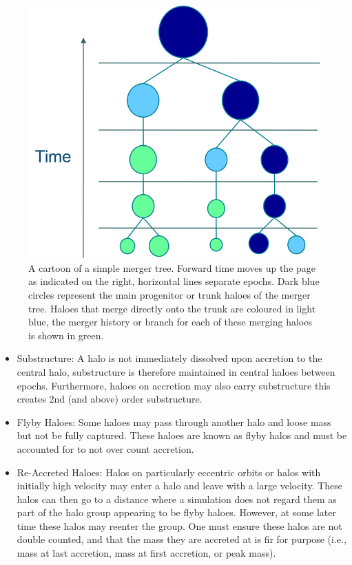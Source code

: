 \begin{figure}[h]
	\centering
	\includegraphics[width = \linewidth]{Figures/Chapter1/Merger_Tree_Simple.png}
    \caption{A cartoon of a simple merger tree. Forward time moves up the page as indicated on the right, horizontal lines separate epochs. Dark blue circles represent the main progenitor or trunk haloes of the merger tree. Haloes that merge directly onto the trunk are coloured in light blue, the merger history or branch for each of these merging haloes is shown in green.}
	\label{fig:SimpleTree}
\end{figure}

\begin{itemize}
    \item Substructure: A halo is not immediately dissolved upon accretion to the central halo, substructure is therefore maintained in central haloes between epochs. Furthermore, haloes on accretion may also carry substructure this creates 2nd (and above) order substructure.
    \item Flyby Haloes: Some haloes may pass through another halo and loose mass but not be fully captured. These haloes are known as flyby halos and must be accounted for to not over count accretion.
    \item Re-Accreted Haloes: Halos on particularly eccentric orbits or halos with initially high velocity may enter a halo and leave with a large velocity. These halos can then go to a distance where a simulation does not regard them as part of the halo group appearing to be flyby haloes. However, at some later time these halos may reenter the group. One must ensure these halos are not double counted, and that the mass they are accreted at is fir for purpose (i.e., mass at last accretion, mass at first accretion, or peak mass).
\end{itemize}

